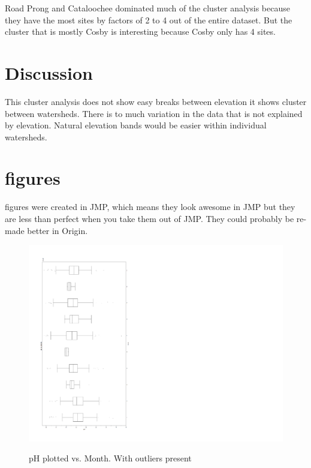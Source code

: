 \documentclass[11pt]{article} %
\begin{document}
Road Prong and Cataloochee dominated much of the cluster analysis because they have the most sites by factors of 2 to 4 out of the entire dataset.  But the cluster that is mostly Cosby is interesting because Cosby only has 4 sites. 

\section{Discussion}
This cluster analysis does not show easy breaks between elevation it shows cluster between watersheds.  There is to much variation in the data that is not explained by elevation. Natural elevation bands would be easier within individual watersheds.
\pagebreak

\section{figures}
figures were created in JMP, which means they look awesome in JMP but they are less than perfect when you take them out of JMP.  They could probably be re-made better in Origin.
\begin{figure}[h!]
  \caption{pH plotted vs. Month.  With outliers present}
  \includegraphics[width=11 in,clip=true,trim=0 30 150 40]{CAgraph1}\\
\label{fig:figure1}
\end{figure}
\pagebreak
\end{document}
